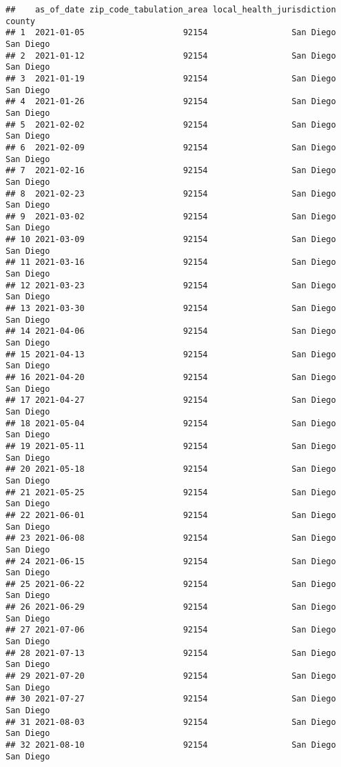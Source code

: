 \documentclass[
]{article}
\begin{document}
\begin{verbatim}
##    as_of_date zip_code_tabulation_area local_health_jurisdiction    county
## 1  2021-01-05                    92154                 San Diego San Diego
## 2  2021-01-12                    92154                 San Diego San Diego
## 3  2021-01-19                    92154                 San Diego San Diego
## 4  2021-01-26                    92154                 San Diego San Diego
## 5  2021-02-02                    92154                 San Diego San Diego
## 6  2021-02-09                    92154                 San Diego San Diego
## 7  2021-02-16                    92154                 San Diego San Diego
## 8  2021-02-23                    92154                 San Diego San Diego
## 9  2021-03-02                    92154                 San Diego San Diego
## 10 2021-03-09                    92154                 San Diego San Diego
## 11 2021-03-16                    92154                 San Diego San Diego
## 12 2021-03-23                    92154                 San Diego San Diego
## 13 2021-03-30                    92154                 San Diego San Diego
## 14 2021-04-06                    92154                 San Diego San Diego
## 15 2021-04-13                    92154                 San Diego San Diego
## 16 2021-04-20                    92154                 San Diego San Diego
## 17 2021-04-27                    92154                 San Diego San Diego
## 18 2021-05-04                    92154                 San Diego San Diego
## 19 2021-05-11                    92154                 San Diego San Diego
## 20 2021-05-18                    92154                 San Diego San Diego
## 21 2021-05-25                    92154                 San Diego San Diego
## 22 2021-06-01                    92154                 San Diego San Diego
## 23 2021-06-08                    92154                 San Diego San Diego
## 24 2021-06-15                    92154                 San Diego San Diego
## 25 2021-06-22                    92154                 San Diego San Diego
## 26 2021-06-29                    92154                 San Diego San Diego
## 27 2021-07-06                    92154                 San Diego San Diego
## 28 2021-07-13                    92154                 San Diego San Diego
## 29 2021-07-20                    92154                 San Diego San Diego
## 30 2021-07-27                    92154                 San Diego San Diego
## 31 2021-08-03                    92154                 San Diego San Diego
## 32 2021-08-10                    92154                 San Diego San Diego

\end{verbatim}
\end{document}
